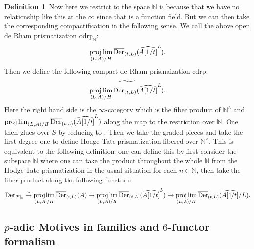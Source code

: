 \documentclass[12pt]{article}
\theoremstyle{definition}
\newtheorem{definition}{Definition}
\begin{document}
\begin{definition}
Now here we restrict to the space $\mathbb{N}$ is because that we have no relationship like this at the $\infty$ since that is a function field. But we can then take the corresponding compactification in the following sense. We call the above open de Rham prismatization $\mathrm{odrp}_\mathbb{N}$:
\begin{align}
\projlim_{(L,A)/H}\overline{\mathrm{Der}}_{(t,L)}(\widehat{A[1/t]}^{L}).
\end{align}
Then we define the following compact de Rham prismaization $\mathrm{cdrp}$:
\begin{align}
\widetilde{\projlim_{(L,A)/H}\overline{\mathrm{Der}}_{(t,L)}(\widehat{A[1/t]}^{L})}.
\end{align}
Here the right hand side is the $\infty$-category which is the fiber product of $\mathbb{N}^\wedge$ and $\projlim_{(L,A)/H}\overline{\mathrm{Der}}_{(t,L)}(\widehat{A[1/t]}^{L})$ along the map to the restriction over $\mathbb{N}$. 
One then glues over $S$ by reducing to \cite{2BL}. Then we take the graded pieces and take the first degree one to define Hodge-Tate prismatization fibered over $\mathbb{N}^\wedge$. This is equivalent to the following definition: one can define this by first consider the subspace $\mathbb{N}$ where one can take the product throughout the whole $\mathbb{N}$ from the Hodge-Tate prismatization in the usual situation for each $n\in \mathbb{N}$, then take the fiber product along the following functors:
\begin{align}
\mathrm{Der}_{\mathcal{F}|_{\mathbb{N}}}\overset{\sim}{\rightarrow} \projlim_{(L,A)/H}\overline{\mathrm{Der}}_{(t,L)}(A) \overset{}{\rightarrow} \projlim_{(L,A)/H}\overline{\mathrm{Der}}_{(t,L)}(\widehat{A[1/t]}^L) \overset{}{\rightarrow} \projlim_{(L,A)/H}\overline{\mathrm{Der}}_{(t,L)}(\widehat{A[1/t]}/L).
\end{align}

\end{definition}



\subsection{$p$-adic Motives in families and $6$-functor formalism}
\end{document}
